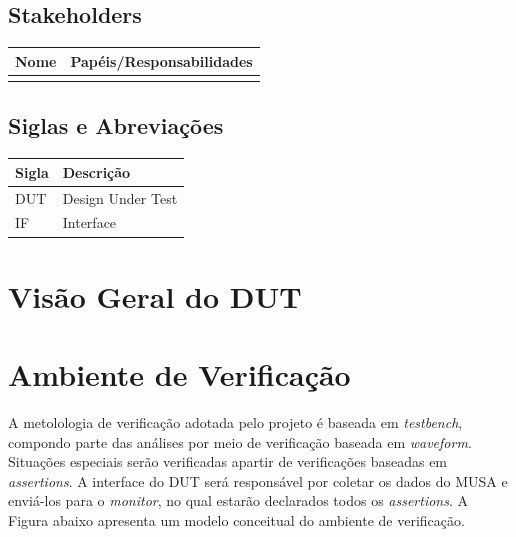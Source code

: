 \documentclass{article}
\begin{document}
	\subsection{Stakeholders}
  \FloatBarrier
  \begin{table}[H] 
    \begin{center}
      \begin{tabular}[pos]{|m{5cm} | m{8cm}|} 
        \hline %
        \cellcolor[gray]{0.9}\textbf{Nome} & \cellcolor[gray]{0.9}\textbf{Papéis/Responsabilidades} \\ \hline
         &  \\ \hline
      \end{tabular}
    \end{center}
  \end{table} 
  
  \subsection{Siglas e Abreviações}
  \FloatBarrier
  \begin{table}[H]
    \begin{center}
      \begin{tabular}[pos]{|m{2cm} | m{11cm}|} 
				\hline 
				\cellcolor[gray]{0.9}\textbf{Sigla} & \cellcolor[gray]{0.9}\textbf{Descrição} \\ \hline
				DUT		& Design Under Test \\ \hline
        IF    & Interface \\ \hline
      \end{tabular}
    \end{center}
  \end{table}  

	\newpage
	\section{Visão Geral do DUT}

  	
	\newpage
	\section{Ambiente de Verificação}
	
  A metolologia de verificação adotada pelo projeto é baseada em \textit{testbench}, compondo parte das análises por meio de verificação baseada em \textit{waveform}. Situações especiais serão verificadas apartir de verificações baseadas em \textit{assertions}. A interface do DUT será responsável por coletar os dados do MUSA e enviá-los para o \textit{monitor}, no qual estarão declarados todos os \textit{assertions}. A Figura abaixo apresenta um modelo conceitual do ambiente de verificação.
		
\end{document}
